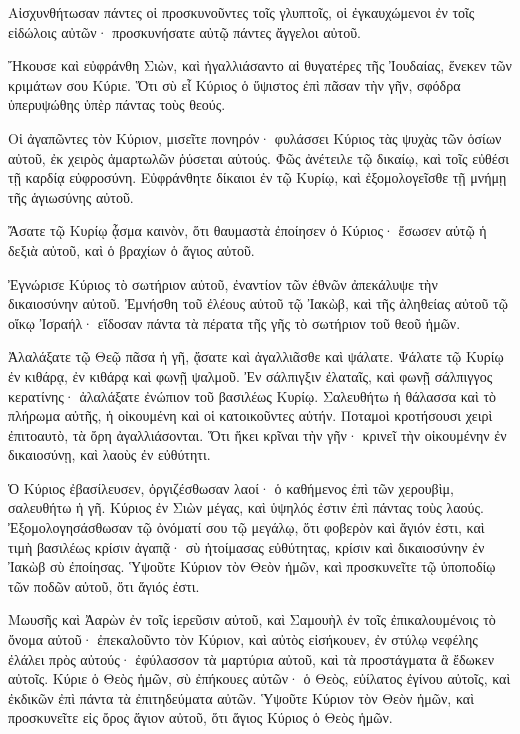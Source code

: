 \begin{spacing}{1.1}
\begin{multicols}{2}
Αἰσχυνθήτωσαν πάντες οἱ προσκυνοῦντες τοῖς γλυπτοῖς, οἱ ἐγκαυχώμενοι ἐν τοῖς εἰδώλοις αὐτῶν· προσκυνήσατε αὐτῷ πάντες ἄγγελοι αὐτοῦ.

Ἤκουσε καὶ εὐφράνθη Σιὼν, καὶ ἠγαλλιάσαντο αἱ θυγατέρες τῆς Ἰουδαίας, ἕνεκεν τῶν κριμάτων σου Κύριε.
Ὅτι σὺ εἶ Κύριος ὁ ὕψιστος ἐπὶ πᾶσαν τὴν γῆν, σφόδρα ὑπερυψώθης ὑπὲρ πάντας τοὺς θεούς.

Οἱ ἀγαπῶντες τὸν Κύριον, μισεῖτε πονηρόν· φυλάσσει Κύριος τὰς ψυχὰς τῶν ὁσίων αὐτοῦ, ἐκ χειρὸς ἁμαρτωλῶν ῥύσεται αὐτούς.
Φῶς ἀνέτειλε τῷ δικαίῳ, καὶ τοῖς εὐθέσι τῇ καρδίᾳ εὐφροσύνη.
Εὐφράνθητε δίκαιοι ἐν τῷ Κυρίῳ, καὶ ἐξομολογεῖσθε τῇ μνήμῃ τῆς ἁγιωσύνης αὐτοῦ.

Ἄσατε τῷ Κυρίῳ ᾆσμα καινὸν, ὅτι θαυμαστὰ ἐποίησεν ὁ Κύριος· ἔσωσεν αὐτῷ ἡ δεξιὰ αὐτοῦ, καὶ ὁ βραχίων ὁ ἅγιος αὐτοῦ.

Ἐγνώρισε Κύριος τὸ σωτήριον αὐτοῦ, ἐναντίον τῶν ἐθνῶν ἀπεκάλυψε τὴν δικαιοσύνην αὐτοῦ.
Ἐμνήσθη τοῦ ἐλέους αὐτοῦ τῷ Ἰακὼβ, καὶ τῆς ἀληθείας αὐτοῦ τῷ οἴκῳ Ἰσραήλ· εἴδοσαν πάντα τὰ πέρατα τῆς γῆς τὸ σωτήριον τοῦ θεοῦ ἡμῶν.

Ἀλαλάξατε τῷ Θεῷ πᾶσα ἡ γῆ, ᾄσατε καὶ ἀγαλλιᾶσθε καὶ ψάλατε.
Ψάλατε τῷ Κυρίῳ ἐν κιθάρᾳ, ἐν κιθάρᾳ καὶ φωνῇ ψαλμοῦ.
Ἐν σάλπιγξιν ἐλαταῖς, καὶ φωνῇ σάλπιγγος κερατίνης· ἀλαλάξατε ἐνώπιον τοῦ βασιλέως Κυρίῳ.
Σαλευθήτω ἡ θάλασσα καὶ τὸ πλήρωμα αὐτῆς, ἡ οἰκουμένη καὶ οἱ κατοικοῦντες αὐτήν.
Ποταμοὶ κροτήσουσι χειρὶ ἐπιτοαυτὸ, τὰ ὄρη ἀγαλλιάσονται.
Ὅτι ἥκει κρῖναι τὴν γῆν· κρινεῖ τὴν οἰκουμένην ἐν δικαιοσύνῃ, καὶ λαοὺς ἐν εὐθύτητι.

Ὁ Κύριος ἐβασίλευσεν, ὀργιζέσθωσαν λαοί· ὁ καθήμενος ἐπὶ τῶν χερουβὶμ, σαλευθήτω ἡ γῆ.
Κύριος ἐν Σιὼν μέγας, καὶ ὑψηλός ἐστιν ἐπὶ πάντας τοὺς λαούς.
Ἐξομολογησάσθωσαν τῷ ὀνόματί σου τῷ μεγάλῳ, ὅτι φοβερὸν καὶ ἅγιόν ἐστι,
καὶ τιμὴ βασιλέως κρίσιν ἀγαπᾷ· σὺ ἡτοίμασας εὐθύτητας, κρίσιν καὶ δικαιοσύνην ἐν Ἰακὼβ σὺ ἐποίησας.
Ὑψοῦτε Κύριον τὸν Θεὸν ἡμῶν, καὶ προσκυνεῖτε τῷ ὑποποδίῳ τῶν ποδῶν αὐτοῦ, ὅτι ἅγιός ἐστι.

Μωυσῆς καὶ Ἀαρὼν ἐν τοῖς ἱερεῦσιν αὐτοῦ, καὶ Σαμουὴλ ἐν τοῖς ἐπικαλουμένοις τὸ ὄνομα αὐτοῦ· ἐπεκαλοῦντο τὸν Κύριον, καὶ αὐτὸς εἰσήκουεν,
ἐν στύλῳ νεφέλης ἐλάλει πρὸς αὐτούς· ἐφύλασσον τὰ μαρτύρια αὐτοῦ, καὶ τὰ προστάγματα ἃ ἔδωκεν αὐτοῖς.
Κύριε ὁ Θεὸς ἡμῶν, σὺ ἐπήκουες αὐτῶν· ὁ Θεὸς, εὐίλατος ἐγίνου αὐτοῖς, καὶ ἐκδικῶν ἐπὶ πάντα τὰ ἐπιτηδεύματα αὐτῶν.
Ὑψοῦτε Κύριον τὸν Θεὸν ἡμῶν, καὶ προσκυνεῖτε εἰς ὄρος ἅγιον αὐτοῦ, ὅτι ἅγιος Κύριος ὁ Θεὸς ἡμῶν.


\end{multicols}
\end{spacing}
